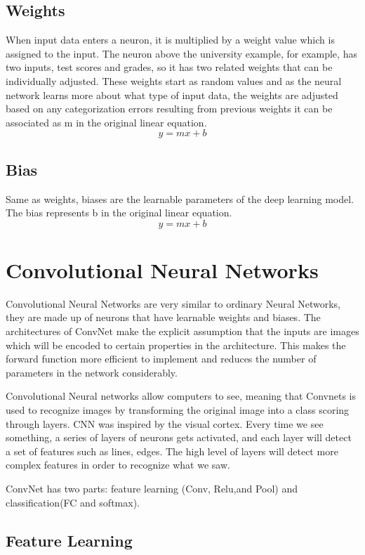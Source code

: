 \documentclass[12pt]{report}
\begin{document}
\subsection{Weights}
When input data enters a neuron, it is multiplied by a weight value 
which is assigned to the input. The neuron above the university example, 
for example, has two inputs, test scores and grades, so it has two related
weights that can be individually adjusted.
These weights start as random values and as the neural network learns more 
about what type of input data, the weights are adjusted based on any categorization
errors resulting from previous weights it can be associated as m in the original 
linear equation.
$$ y = mx + b$$


\subsection{Bias}
Same as weights, biases are the learnable parameters of the deep learning model.
The bias represents b in the original linear equation.
$$ y = mx + b $$

\section{Convolutional Neural Networks}
Convolutional Neural Networks are very similar to ordinary Neural Networks, 
they are made up of neurons that have learnable weights and biases.
The architectures of ConvNet make the explicit assumption that 
the inputs are images which will be encoded to certain properties in the architecture. 
This makes the forward function more efficient to implement and reduces the number of 
parameters in the network considerably.

Convolutional Neural networks allow computers to see, 
meaning that Convnets is used to recognize images by 
transforming the original image into a class scoring through layers.
CNN was inspired by the visual cortex.
Every time we see something, a series of layers of neurons gets activated, 
and each layer will detect a set of features such as lines, edges. 
The high level of layers will detect more complex features in order to
 recognize what we saw.

ConvNet has two parts: feature learning (Conv, Relu,and Pool) and 
classification(FC and softmax).

\subsection{Feature Learning}
\end{document}
